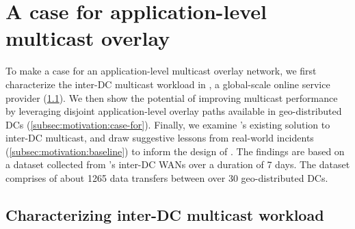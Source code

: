 \section{A case for application-level multicast overlay}
\label{sec:motivation}


To make a case for an
application-level multicast overlay network,
we first characterize the inter-DC multicast workload in
\company, a global-scale online service provider
(\Section\ref{subsec:motivation:multicast-traffic}).
We then show the potential of improving multicast performance
by leveraging disjoint application-level overlay paths available in geo-distributed DCs
(\Section\ref{subsec:motivation:case-for}).
Finally, we examine \company's existing solution to
inter-DC multicast, and draw suggestive lessons from real-world
incidents (\Section\ref{subsec:motivation:baseline})
to inform the design of \name.
The findings are based on a dataset collected from \company's
inter-DC WANs over a duration of 7 days.
The dataset comprises of about 1265 data transfers
between over 30 geo-distributed DCs.




\subsection{Characterizing inter-DC multicast workload}
\label{subsec:motivation:multicast-traffic}


